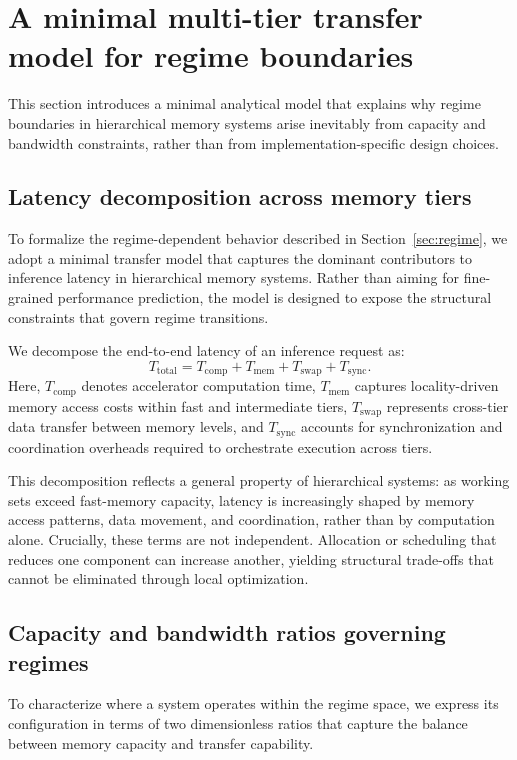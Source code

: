 \section{A minimal multi-tier transfer model for regime boundaries}
\label{sec:model}

This section introduces a minimal analytical model that explains why regime boundaries in hierarchical memory systems arise inevitably from capacity and bandwidth constraints, rather than from implementation-specific design choices.

\subsection{Latency decomposition across memory tiers}
To formalize the regime-dependent behavior described in Section~\ref{sec:regime}, we adopt a minimal transfer model that captures the dominant contributors to inference latency in hierarchical memory systems. Rather than aiming for fine-grained performance prediction, the model is designed to expose the structural constraints that govern regime transitions.

We decompose the end-to-end latency of an inference request as:
\begin{equation}
T_{\mathrm{total}} = T_{\mathrm{comp}} + T_{\mathrm{mem}} + T_{\mathrm{swap}} + T_{\mathrm{sync}}.
\label{eq:latency_decomp}
\end{equation}
Here, $T_{\mathrm{comp}}$ denotes accelerator computation time, $T_{\mathrm{mem}}$ captures locality-driven memory access costs within fast and intermediate tiers, $T_{\mathrm{swap}}$ represents cross-tier data transfer between memory levels, and $T_{\mathrm{sync}}$ accounts for synchronization and coordination overheads required to orchestrate execution across tiers.

This decomposition reflects a general property of hierarchical systems: as working sets exceed fast-memory capacity, latency is increasingly shaped by memory access patterns, data movement, and coordination, rather than by computation alone. Crucially, these terms are not independent. Allocation or scheduling that reduces one component can increase another, yielding structural trade-offs that cannot be eliminated through local optimization.

\subsection{Capacity and bandwidth ratios governing regimes}
To characterize where a system operates within the regime space, we express its configuration in terms of two dimensionless ratios that capture the balance between memory capacity and transfer capability.

